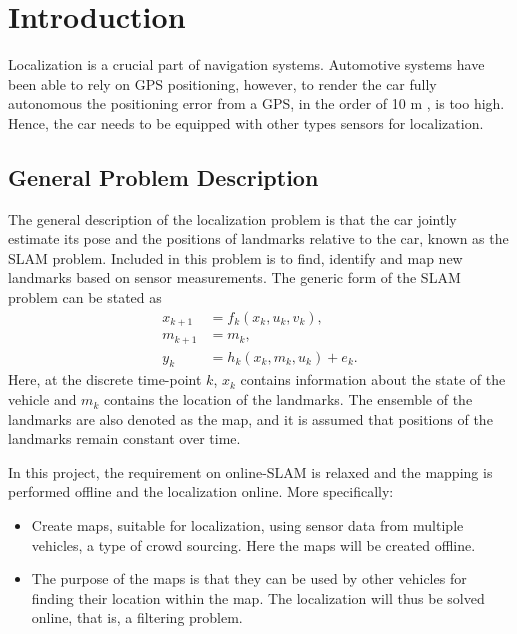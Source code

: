 \section{Introduction}

Localization is a crucial part of navigation systems. Automotive
systems have been able to rely on GPS positioning, however, to render
the car fully autonomous the positioning error from a GPS, in the
order of 10 m \cite{4770175}, is too high. Hence, the car needs to be
equipped with other types sensors for localization.

\subsection{General Problem Description}

The general description of the localization problem is that the car
jointly estimate its pose and the positions of landmarks relative to
the car, known as the \gls{SLAM} problem. Included in this problem is
to find, identify and map new landmarks based on sensor
measurements. The generic form of the \gls{SLAM} problem can be stated
as
\begin{subequations}
  \begin{align}
    x_{k+1} & = f_k(x_k, u_k,v_k), \\
    m_{k+1} & = m_k, \\
    y_k & = h_k(x_k, m_k, u_k) + e_k.
  \end{align}
\end{subequations}
Here, at the discrete time-point $k$, $x_k$ contains information about
the state of the vehicle and $m_k$ contains the location of the
landmarks. The ensemble of the landmarks are also denoted as the map,
and it is assumed that positions of the landmarks remain constant over
time.

In this project, the requirement on online-\gls{SLAM} is relaxed and
the mapping is performed offline and the localization online. More
specifically:
\begin{itemize}
\item Create maps, suitable for localization, using sensor data from
  multiple vehicles, a type of crowd sourcing. Here the maps will be
  created offline.

\item The purpose of the maps is that they can be used by other
  vehicles for finding their location within the map. The localization
  will thus be solved online, that is, a filtering problem.
\end{itemize}


